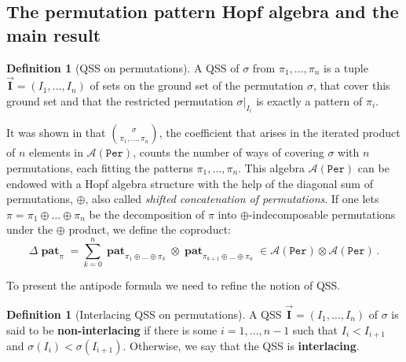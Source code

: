 \documentclass[submission]{FPSAC2023}
\theoremstyle{definition}
\newtheorem{defin}[thm]{Definition}
\newcommand{\III}{\vec{\mathbf{I}}}
\DeclareMathOperator{\pat}{\mathbf{pat}}
\begin{document}
\subsection{The permutation pattern Hopf algebra and the main result}




\begin{defin}[QSS on permutations]\label{defin:QSS}
A QSS of $\sigma$ from $\pi_1, \dots, \pi_n$ is a tuple $\III = (I_1, \dots, I_n)$ of sets on the ground set of the permutation $\sigma$, that cover this ground set and that the restricted permutation $\sigma|_{I_i}$ is exactly a pattern of $\pi_i$.
\end{defin}
It was shown in \cite{Penaguiao2020} that $\binom{\sigma}{\pi_1, \dots, \pi_n}$, the coefficient that arises in the iterated product of $n$ elements in $\mathcal A(\mathtt{Per})$, counts the number of ways of covering $\sigma$ with $n$ permutations, each fitting the patterns $\pi_1, \dots, \pi_n$.
This algebra $\mathcal A(\mathtt{Per})$ can be endowed with a Hopf algebra structure with the help of the diagonal sum of permutations, $\oplus$, also called \emph{shifted concatenation of permutations}.
If one lets $\pi = \pi_1 \oplus \dots \oplus \pi_n$ be the decomposition of $\pi$ into $\oplus$-indecomposable permutations under the $\oplus$ product, we define the coproduct:
$$\Delta \pat_{\pi} = \sum_{k=0}^n \pat_{\pi_1\oplus \dots \oplus \pi_k} \otimes \pat_{\pi_{k+1}\oplus \dots \oplus \pi_n} \in \mathcal A (\mathtt{Per}) \otimes \mathcal A (\mathtt{Per})\, .$$

To present the antipode formula we need to refine the notion of QSS.
\begin{defin}[Interlacing QSS on permutations]
A QSS $\III = (I_1, \dots, I_n)$ of $\sigma$ is said to be \textbf{non-interlacing} if there is some $i=1, \dots, n-1$ such that $I_i < I_{i+1}$ and $\sigma(I_i) < \sigma(I_{i+1})$.
Otherwise, we say that the QSS is \textbf{interlacing}. 
\end{defin}
\end{document}
